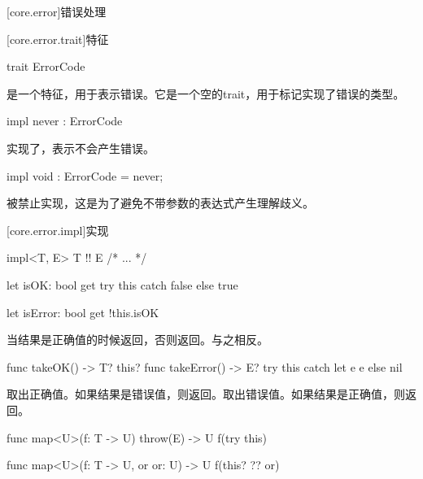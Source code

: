 [core.error]{错误处理}

[core.error.trait]{特征}

\begin{itemdecl}
trait ErrorCode { }
\end{itemdecl}

\pnum
{}是一个特征，用于表示错误。它是一个空的trait，用于标记实现了错误的类型。

\begin{itemdecl}
impl never : ErrorCode { }
\end{itemdecl}

\pnum
{}实现了，表示不会产生错误。

\begin{itemdecl}
impl void : ErrorCode = never;
\end{itemdecl}

\pnum
{}被禁止实现，这是为了避免不带参数的表达式产生理解歧义。

[core.error.impl]{实现}

\begin{itemdecl}
impl<T, E> T !! E { /* ... */ }
\end{itemdecl}

\begin{itemdecl}
let isOK: bool {
    get {
        try this catch { false } else { true }
    }
}

let isError: bool {
    get { !this.isOK }
}
\end{itemdecl}

\pnum
{}当结果是正确值的时候返回，否则返回。与之相反。

\begin{itemdecl}
func takeOK() -> T? { this? }
func takeError() -> E? { try this catch let e { e } else { nil } }
\end{itemdecl}

\pnum
{}取出正确值。如果结果是错误值，则返回。取出错误值。如果结果是正确值，则返回。

\begin{itemdecl}
func map<U>(f: T -> U) throw(E) -> U {
    f(try this)
}

func map<U>(f: T -> U, or or: U) -> U {
    f(this? ?? or)
}
\end{itemdecl}

